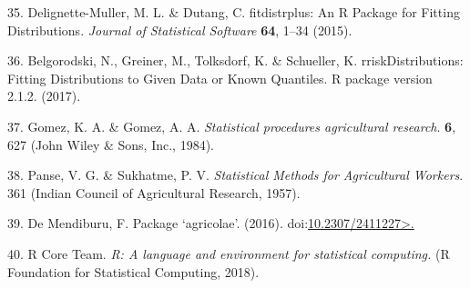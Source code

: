 \documentclass[12pt,oneside]{article}
\begin{document}
\leavevmode\hypertarget{ref-Delignette-Muller_and_Dutang_2015}{}%
35. Delignette-Muller, M. L. \& Dutang, C. fitdistrplus: An R Package
for Fitting Distributions. \emph{Journal of Statistical Software}
\textbf{64}, 1--34 (2015).

\leavevmode\hypertarget{ref-Belgorodski_et_al_2017}{}%
36. Belgorodski, N., Greiner, M., Tolksdorf, K. \& Schueller, K.
rriskDistributions: Fitting Distributions to Given Data or Known
Quantiles. R package version 2.1.2. (2017).

\leavevmode\hypertarget{ref-Gomez_and_Gomez_1984}{}%
37. Gomez, K. A. \& Gomez, A. A. \emph{Statistical procedures
agricultural research}. \textbf{6}, 627 (John Wiley \& Sons, Inc.,
1984).

\leavevmode\hypertarget{ref-Panse_and_Sukhatme_1957}{}%
38. Panse, V. G. \& Sukhatme, P. V. \emph{Statistical Methods for
Agricultural Workers}. 361 (Indian Council of Agricultural Research,
1957).

\leavevmode\hypertarget{ref-DeMendiburu_2016}{}%
39. De Mendiburu, F. Package `agricolae'. (2016).
doi:\href{https://doi.org/10.2307/2411227\%3E.}{10.2307/2411227\textgreater.}

\leavevmode\hypertarget{ref-RCoreTeam_2018}{}%
40. R Core Team. \emph{R: A language and environment for statistical
computing.} (R Foundation for Statistical Computing, 2018).
\end{document}

